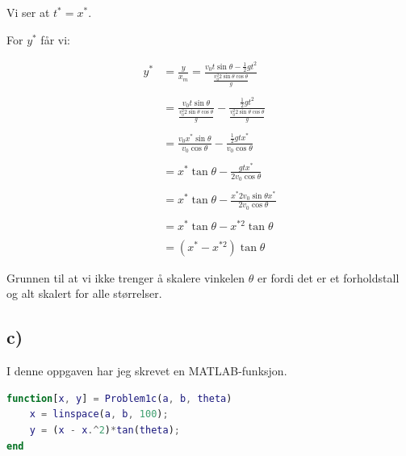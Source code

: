 \documentclass{article}
\begin{document}
\begin{flushleft}
Vi ser at \(t^* = x^*\).
\end{flushleft}

\begin{flushleft}
For \(y^*\) får vi:
\end{flushleft}

\begin{align*}
y^* & = \frac{y}{x_m} = \frac{v_0t\sin{\theta} - \frac{1}{2}gt^2}{\frac{v_0^{2}2\sin{\theta}\cos{\theta}}{g}} \\ \\
 & = \frac{v_0t\sin{\theta}}{\frac{v_0^{2}2\sin{\theta}\cos{\theta}}{g}} - \frac{\frac{1}{2}gt^2}{\frac{v_0^{2}2\sin{\theta}\cos{\theta}}{g}} \\ \\
 & = \frac{v_{0}x^*\sin{\theta}}{v_{0}\cos{\theta}} - \frac{\frac{1}{2}g t x^*}{v_0\cos{\theta}} \\ \\
 & = x^*\tan{\theta} - \frac{g t x^*}{2 v_{0}\cos{\theta}} \\ \\
 & = x^*\tan{\theta} - \frac{x^*2 v_{0}\sin{\theta}x^*}{2 v_{0}\cos{\theta}} \\ \\
 & = x^*\tan{\theta} - x^{*2}\tan{\theta} \\ \\
 & = (x^* - x^{*2})\tan{\theta}
\end{align*}

\bigskip

\begin{flushleft}
Grunnen til at vi ikke trenger å skalere vinkelen \(\theta\) er fordi det er et forholdstall og alt skalert for alle størrelser.
\end{flushleft}


%
%

\subsection*{c)}

\begin{flushleft}
I denne oppgaven har jeg skrevet en MATLAB-funksjon.
\end{flushleft}

\begin{lstlisting}[language=Matlab]
function[x, y] = Problem1c(a, b, theta)
    x = linspace(a, b, 100);
    y = (x - x.^2)*tan(theta);
end
\end{lstlisting}
\end{document}
